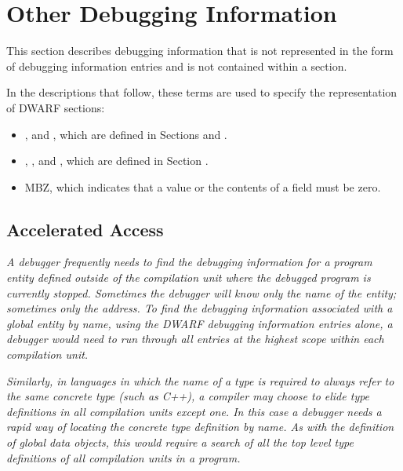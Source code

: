 \chapter{Other Debugging Information}
\label{chap:otherdebugginginformation}
This section describes debugging information that is not
represented in the form of debugging information entries and
is not contained within a \dotdebuginfo{} section.

In the descriptions that follow, these terms are used to
specify the representation of DWARF sections:
\begin{itemize}

\item
\HFTinitiallength{}, \HFTsectionoffset{} and 
\HFTsectionlength{}, which are
defined in 
Sections  and 
.

\item
\HFTsbyte{}, 
\HFTubyte{}, 
\HFTuhalf{} and 
\HFTuword{}, 
which are defined in 
Section .

\item
\bb
MBZ, which indicates that a value or the contents of a field must be zero.
\eb

\end{itemize}

\section{Accelerated Access}
\label{chap:acceleratedaccess}

\textit{A debugger frequently needs to find the debugging information
for a program entity defined outside of the compilation unit
where the debugged program is currently stopped. Sometimes the
debugger will know only the name of the entity; sometimes only
the address. To find the debugging information associated with
a global entity by name, using the DWARF debugging information
entries alone, a debugger would need to run through all
entries at the highest scope within each compilation unit.}

\textit{Similarly, in languages in which the name of a type is
required to always refer to the same concrete type (such as
C++), a compiler may choose to elide type definitions in
all compilation units except one. In this case a debugger
needs a rapid way of locating the concrete type definition
by name. As with the definition of global data objects, this
would require a search of all the top level type definitions
of all compilation units in a program.}


